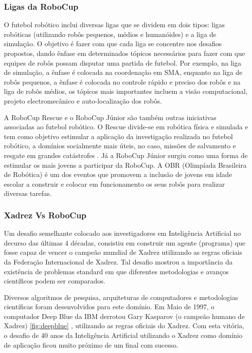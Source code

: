 \subsubsection{Ligas da RoboCup}
O futebol robótico inclui diversas ligas que se dividem em dois tipos: ligas robóticas (utilizando robôs pequenos, médios e 
humanóides) e a liga de simulação. O objetivo é fazer com que cada liga se concentre nos desafios propostos, dando ênfase em 
determinados tópicos necessários para fazer com que equipes de robôs possam disputar uma partida de futebol. Por exemplo, 
na liga de simulação, a ênfase é colocada na coordenação em SMA, enquanto na liga de robôs pequenos, a ênfase é colocada no 
controle rápido e preciso dos robôs e na liga de robôs médios, os tópicos mais importantes incluem a visão computacional, 
projeto electromecânico e auto-localização dos robôs.

A RoboCup Rescue \cite{kitano99} e o RoboCup Júnior \cite{sklar02} são também outras iniciativas associadas ao futebol robótico. 
O Rescue divide-se em robótica física e simulada e tem como objetivo estimular a aplicação da investigação realizada no futebol 
robótico, a domínios socialmente mais úteis, no caso, missões de salvamento e resgate em grandes catástrofes \cite{rescue01}. Já 
a RoboCup Júnior surgiu como uma forma de estimular os mais jovens a participar da RoboCup. A OBR (Olimpíada Brasileira de Robótica) 
é um dos eventos que promovem a inclusão de jovens em idade escolar a construir e colocar em funcionamento os seus robôs para 
realizar diversas tarefas.

\subsubsection{Xadrez Vs RoboCup}
Um desafio semelhante colocado aos investigadores em Inteligência Artificial no decurso das últimas 4 décadas, consistiu em 
construir um agente (programa) que fosse capaz de vencer o campeão mundial de Xadrez utilizando as regras oficiais da Federação
Internacional de Xadrez. Tal desafio mostrou a importância da existência de problemas standard em que diferentes metodologias e
avanços científicos podem ser comparados. 

Diversos algoritmos de pesquisa, arquiteturas de computadores e metodologias científicas foram desenvolvidos para este domínio. 
Em Maio de 1997, o computador Deep Blue da IBM \cite{deepblue} derrotou Gary Kasparov (o campeão humano de Xadrez) \ref{fig:deepblue}
, utilizando as regras oficiais do Xadrez. Com esta vitória, o desafio de 40 anos da Inteligência Artificial utilizando o Xadrez 
como domínio de aplicação ficou muito próximo de um final com sucesso. 

